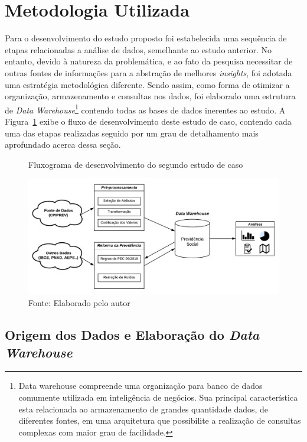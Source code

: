 \section{Metodologia Utilizada}\label{cap05:metodologia}

Para o desenvolvimento do estudo proposto foi estabelecida uma sequência de etapas relacionadas a análise de dados, semelhante ao estudo anterior. No entanto, devido à natureza da problemática, e ao fato da pesquisa necessitar de outras fontes de informações para a abstração de melhores \textit{insights}, foi adotada uma estratégia metodológica diferente. Sendo assim, como forma de otimizar a organização, armazenamento e consultas nos dados, foi elaborado uma estrutura de \textit{Data Warehouse}\footnote{Data warehouse compreende uma organização para banco de dados comumente utilizada em inteligência de negócios. Sua principal característica esta relacionada ao armazenamento de grandes quantidade dados, de diferentes fontes, em uma arquitetura que possibilite a realização de consultas complexas com maior grau de facilidade.} contendo todas as bases de dados inerentes ao estudo. A Figura~\ref{fig:cap05:metodologia} exibe o fluxo de desenvolvimento deste estudo de caso, contendo cada uma das etapas realizadas seguido por um grau de detalhamento mais aprofundado acerca dessa seção.

\begin{figure}[!ht]
    \centering
    \caption{Fluxograma de desenvolvimento do segundo estudo de caso}
    \includegraphics[width=\textwidth]{figs/cap05_metodologia_estudo02.pdf}
    \caption*{\footnotesize{Fonte: Elaborado pelo autor}}
    \label{fig:cap05:metodologia}
\end{figure}

\subsection{Origem dos Dados e Elaboração do \textit{Data Warehouse}}

